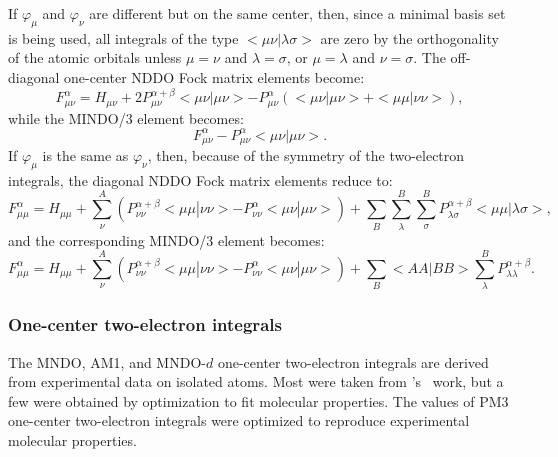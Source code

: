 If $\varphi_{\mu}$ and $\varphi_{\nu}$  are different but on the same center,
then, since a minimal basis set is being used, all integrals of the type
$<\!\mu\nu|\lambda\sigma\!>$ are zero by the orthogonality of the atomic
orbitals unless $\mu=\nu$ and $\lambda=\sigma$, or $\mu=\lambda$ and
$\nu=\sigma$.  The off-diagonal one-center NDDO Fock matrix elements become:
$$
 F_{\mu\nu}^{\alpha} = H_{\mu\nu}+ 2P_{\mu\nu}^{\alpha+\beta} <\mu\nu|\mu\nu>
- P_{\mu\nu}^{\alpha}( <\mu\nu|\mu\nu> +<\mu\mu|\nu\nu>),
$$
while the MINDO/3 element becomes:
$$
F_{\mu\nu}^{\alpha} - P_{\mu\nu}^{\alpha} <\mu\nu|\mu\nu>.
$$
 If  $\varphi_{\mu}$ is the same as $\varphi_{\nu}$,  then, because of the
symmetry of the two-electron integrals, the diagonal NDDO
Fock matrix elements reduce to:
$$
F_{\mu\mu}^{\alpha} = H_{\mu\mu}+ \sum_{\nu}^A(P_{\nu\nu}^{\alpha+\beta}
<\mu\mu|\nu\nu> - P_{\nu\nu}^{\alpha}<\mu\nu|\mu\nu>)
+\sum_B\sum_{\lambda}^B\sum_{\sigma}^BP_{\lambda\sigma}^{\alpha+\beta}<\mu\mu|\lambda\sigma>,
$$
and the corresponding MINDO/3 element becomes:
$$
F_{\mu\mu}^{\alpha} = H_{\mu\mu}+ \sum_{\nu}^A(P_{\nu\nu}^{\alpha+\beta}
<\mu\mu|\nu\nu> - P_{\nu\nu}^{\alpha}<\mu\nu|\mu\nu>)
+\sum_B<AA|BB>\sum_{\lambda}^B P_{\lambda\lambda}^{\alpha+\beta}.
$$

\subsubsection{One-center two-electron integrals}
The MNDO, AM1, and MNDO-$d$ one-center two-electron integrals are derived from
experimental data on isolated atoms. Most were taken from
's~\cite{oleari} work, but a few were obtained by optimization to
fit molecular properties. The values of PM3 one-center two-electron integrals
were optimized to reproduce experimental molecular properties.

